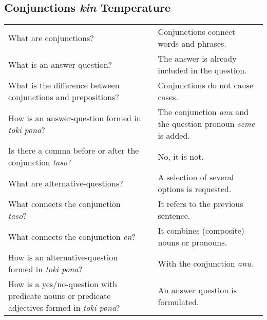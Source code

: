 \subsection*{Conjunctions \textit{kin} Temperature} 
\label{'conjunctions_temperature'}
%
\begin{supertabular}{p{5,5cm}|ll}
What are conjunctions? && Conjunctions connect words and phrases. \\ %
What is an answer-question? && The answer is already included in the question. \\ %
What is the difference between conjunctions and prepositions? && Conjunctions do not cause cases. \\ %
How is an answer-question formed in \textit{toki pona}? && The conjunction \textit{anu} and the question pronoun \textit{seme} is added. \\ %
Is there a comma before or after the conjunction \textit{taso}? && No, it is not. \\ %
What are alternative-questions? && A selection of several options is requested.  \\ %
What connects the conjunction \textit{taso}? && It refers to the previous sentence.  \\ %
What connects the conjunction \textit{en}? && It combines (composite) nouns or pronouns. \\ %
How is an alternative-question formed in \textit{toki pona}? && With the conjunction \textit{anu}. \\ %
How is a yes/no-question with predicate nouns or predicate adjectives formed in \textit{toki pona}? && An answer question is formulated. \\ %
\end{supertabular}

